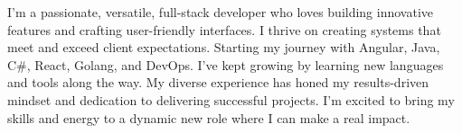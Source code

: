 I'm a passionate, versatile, full-stack developer who loves 
building innovative features and crafting user-friendly 
interfaces. 
I thrive on creating systems that meet and exceed client 
expectations. 
Starting my journey with Angular, Java, C\#,  React, Golang, 
and DevOps. 
I've kept growing by learning new languages and tools along 
the way. 
My diverse experience has honed my results-driven mindset 
and dedication to delivering successful projects. 
I'm excited to bring my skills and energy to a dynamic 
new role where I can make a real impact.